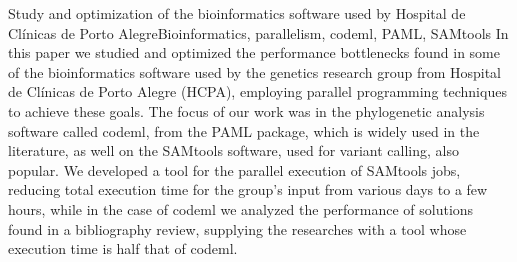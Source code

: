 \documentclass[cic,tc]{iiufrgs}
\begin{document}
\begin{englishabstract}{Study and optimization of the bioinformatics software used by Hospital de Clínicas de Porto Alegre}{Bioinformatics, parallelism, codeml, PAML, SAMtools} In this paper we studied and optimized the performance bottlenecks found in some of the bioinformatics software used by the genetics research group from Hospital de Clínicas de Porto Alegre (HCPA), employing parallel programming techniques to achieve these goals. The focus of our work was in the phylogenetic analysis software called codeml, from the PAML package, which is widely used in the literature, as well on the SAMtools software, used for variant calling, also popular. We developed a tool for the parallel execution of SAMtools jobs, reducing total execution time for the group's input from various days to a few hours, while in the case of codeml we analyzed the performance of solutions found in a bibliography review, supplying the researches with a tool whose execution time is half that of codeml.
\end{englishabstract}

\listoffigures

\listoftables
\end{document}
